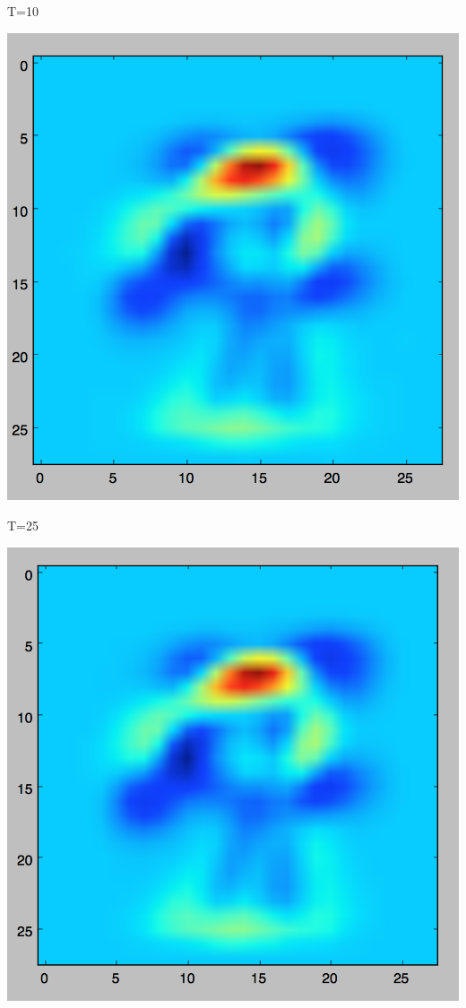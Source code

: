 \documentclass[twoside,11pt]{homework}
\begin{document}
T=10

\includegraphics[scale=.5]{images/w10.png}

T=25

\includegraphics[scale=.5]{images/w25.png}
\end{document}
